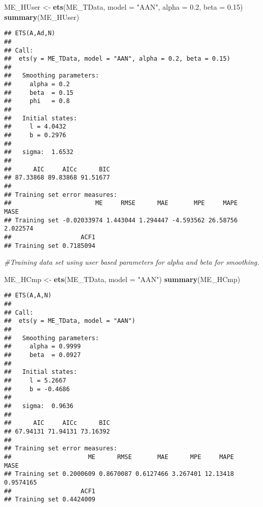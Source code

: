 \documentclass[
]{article}
\newenvironment{Shaded}{\begin{snugshade}}{\end{snugshade}}
\newcommand{\CommentTok}[1]{\textcolor[rgb]{0.56,0.35,0.01}{\textit{#1}}}
\newcommand{\DataTypeTok}[1]{\textcolor[rgb]{0.13,0.29,0.53}{#1}}
\newcommand{\FloatTok}[1]{\textcolor[rgb]{0.00,0.00,0.81}{#1}}
\newcommand{\KeywordTok}[1]{\textcolor[rgb]{0.13,0.29,0.53}{\textbf{#1}}}
\newcommand{\NormalTok}[1]{#1}
\newcommand{\StringTok}[1]{\textcolor[rgb]{0.31,0.60,0.02}{#1}}
\begin{document}
\begin{Shaded}
\begin{Highlighting}[]
\NormalTok{ME_HUser <-}\StringTok{ }\KeywordTok{ets}\NormalTok{(ME_TData, }\DataTypeTok{model =} \StringTok{"AAN"}\NormalTok{, }\DataTypeTok{alpha =} \FloatTok{0.2}\NormalTok{, }\DataTypeTok{beta =} \FloatTok{0.15}\NormalTok{)}
\KeywordTok{summary}\NormalTok{(ME_HUser)}
\end{Highlighting}
\end{Shaded}

\begin{verbatim}
## ETS(A,Ad,N) 
## 
## Call:
##  ets(y = ME_TData, model = "AAN", alpha = 0.2, beta = 0.15) 
## 
##   Smoothing parameters:
##     alpha = 0.2 
##     beta  = 0.15 
##     phi   = 0.8 
## 
##   Initial states:
##     l = 4.0432 
##     b = 0.2976 
## 
##   sigma:  1.6532
## 
##      AIC     AICc      BIC 
## 87.33868 89.83868 91.51677 
## 
## Training set error measures:
##                       ME     RMSE      MAE       MPE     MAPE     MASE
## Training set -0.02033974 1.443044 1.294447 -4.593562 26.58756 2.022574
##                   ACF1
## Training set 0.7185094
\end{verbatim}

\begin{Shaded}
\begin{Highlighting}[]
\CommentTok{#Training data set using user based parameters for alpha and beta for smoothing.}
\end{Highlighting}
\end{Shaded}

\begin{Shaded}
\begin{Highlighting}[]
\NormalTok{ME_HCmp <-}\StringTok{ }\KeywordTok{ets}\NormalTok{(ME_TData, }\DataTypeTok{model =} \StringTok{"AAN"}\NormalTok{)}
\KeywordTok{summary}\NormalTok{(ME_HCmp)}
\end{Highlighting}
\end{Shaded}

\begin{verbatim}
## ETS(A,A,N) 
## 
## Call:
##  ets(y = ME_TData, model = "AAN") 
## 
##   Smoothing parameters:
##     alpha = 0.9999 
##     beta  = 0.0927 
## 
##   Initial states:
##     l = 5.2667 
##     b = -0.4686 
## 
##   sigma:  0.9636
## 
##      AIC     AICc      BIC 
## 67.94131 71.94131 73.16392 
## 
## Training set error measures:
##                     ME      RMSE       MAE      MPE     MAPE      MASE
## Training set 0.2000609 0.8670087 0.6127466 3.267401 12.13418 0.9574165
##                   ACF1
## Training set 0.4424009
\end{verbatim}
\end{document}
